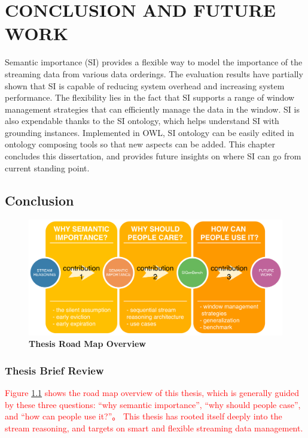  
\chapter{CONCLUSION AND FUTURE WORK}
Semantic importance (SI) provides a flexible way to model the importance of the streaming data from various data orderings.
The evaluation results have partially shown that SI is capable of reducing system overhead and increasing system performance. 
The flexibility lies in the fact that SI supports a range of window management strategies that can efficiently manage the data in the window. 
SI is also expendable thanks to the SI ontology, which helps understand SI with grounding instances. 
Implemented in OWL, SI ontology can be easily edited in ontology composing tools so that new aspects can be added. 
This chapter concludes this dissertation, and provides future insights on where SI can go from current standing point. 
%
\section{Conclusion}

\begin{figure}[!htbp]
	\centering
    \includegraphics[width=5in]{img/7-trm.pdf}
    \caption{\textbf{Thesis Road Map Overview}}
    \label{fig:7-trm}
\end{figure}
%
\subsection{Thesis Brief Review}
\textcolor{red}{
Figure \ref{fig:7-trm} shows the road map overview of this thesis, which is generally guided by these three questions: 
``why semantic importance'', ``why should people case'', and ``how can people use it?''。
This thesis has rooted itself deeply into the stream reasoning, and targets on smart and flexible streaming data management. 
}

